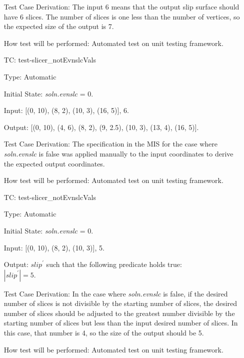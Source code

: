 \documentclass[12pt, titlepage]{article}
\newcounter{utestnum} %
\begin{document}
\begin{enumerate}[label=TC\arabic*:,ref={\arabic*}]
	Test Case Derivation: The input 6 means that the output slip surface should 
	have 6 slices. The number of slices is one less than the number of 
	vertices, so the expected size of the output is 7.
	
	How test will be performed: Automated test on unit testing framework.
	
	\item [TC\refstepcounter{utestnum}\theutestnum: 
	\label{TC_SlicerNotEvnslcVals}] 
	test-slicer\_notEvnslcVals
	
	Type: Automatic
	
	Initial State: \textit{soln.evnslc} = 0.
	
	Input: [(0, 10), (8, 2), (10, 3), (16, 5)], 6.
	
	Output: [(0, 10), (4, 6), (8, 2), (9, 2.5), (10, 3), (13, 4), (16, 5)].
	
	Test Case Derivation: The specification in the MIS for the case where 
	\textit{soln.evnslc} is false was applied manually to the input coordinates 
	to derive the expected output coordinates.
	
	How test will be performed: Automated test on unit testing framework.
	
	\item [TC\refstepcounter{utestnum}\theutestnum: 
	\label{TC_SlicerNotEvnslcIndivisible}] 
	test-slicer\_notEvnslcVals
	
	Type: Automatic
	
	Initial State: \textit{soln.evnslc} = 0.
	
	Input: [(0, 10), (8, 2), (10, 3)], 5.
	
	Output: $\textit{slip}^\prime$ such that the following predicate holds 
	true:\\ 
	$|\textit{slip}^\prime| = 5$.
	
	Test Case Derivation: In the case where \textit{soln.evnslc} is false, if 
	the desired number of slices is not divisible by the starting number of 
	slices, the desired number of slices should be adjusted to the greatest 
	number divisible by the starting number of slices but less than the input 
	desired number of slices. In this case, that number is 4, so the size of 
	the output should be 5.
	
	How test will be performed: Automated test on unit testing framework.
	
\end{enumerate}
\end{document}
